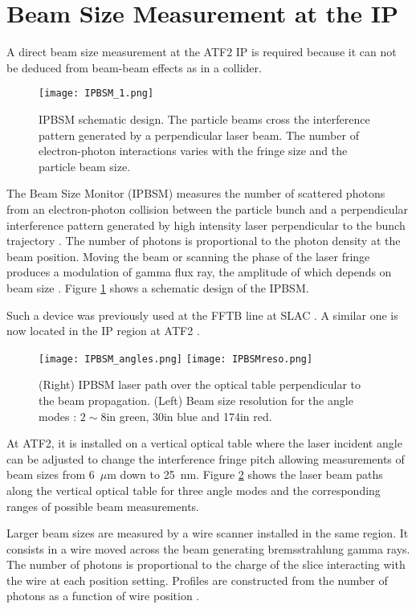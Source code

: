 \section{Beam Size Measurement at the IP}
A direct beam size measurement at the ATF2 IP is required because it can not be deduced from beam-beam effects as in a collider.\par
\begin{figure}[htb]
 \begin{center}
  \texttt{[image: IPBSM\_1.png]}\caption{IPBSM schematic design. The particle beams cross the interference pattern generated by a perpendicular laser beam. The number of electron-photon interactions varies with the fringe size and the particle beam size.}\label{f:IPBSM}
 \end{center}
\end{figure}
The Beam Size Monitor (IPBSM) measures the number of scattered photons from an electron-photon collision between the particle bunch and a perpendicular interference pattern generated by high intensity laser perpendicular to the bunch trajectory \cite{Shintake1992453}. The number of photons is proportional to the photon density at the beam position. Moving the beam or scanning the phase of the laser fringe produces a modulation of gamma flux ray, the amplitude of which depends on beam size \cite{Yves}. Figure \ref{f:IPBSM} shows a schematic design of the IPBSM.\par
Such a device was previously used at the FFTB line at SLAC \cite{Shintake:1995sg}. A similar one is now located in the IP region at ATF2 \cite{Jackelinethese}.\par
\begin{figure}[htb]
 \begin{center}
  \texttt{[image: IPBSM\_angles.png]}
  \texttt{[image: IPBSMreso.png]}
  \caption{(Right) IPBSM laser path over the optical table perpendicular to the beam propagation. (Left) Beam size resolution for the angle modes : $2\sim8$\degree in green, 30\degree in blue and 174\degree in red.}\label{f:IPBSMangles}
 \end{center}
\end{figure}
At ATF2, it is installed on a vertical optical table where the laser incident angle can be adjusted to change the interference fringe pitch allowing measurements of beam sizes from 6~$\mu$m down to 25~nm. Figure \ref{f:IPBSMangles} shows the laser beam paths along the vertical optical table for three angle modes and the corresponding ranges of possible beam measurements.\par
Larger beam sizes are measured by a wire scanner installed in the same region. It consists in a wire moved across the beam generating bremsstrahlung gamma rays. The number of photons is proportional to the charge of the slice interacting with the wire at each position setting. Profiles are constructed from the number of photons as a function of wire position \cite{Hayano:2000xf}.

